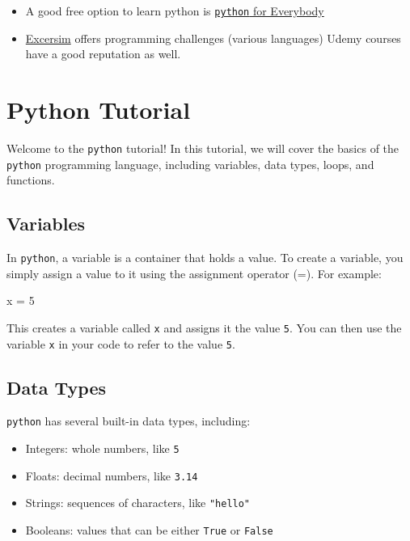 \documentclass[
  letterpaper,
  DIV=11,
  numbers=noendperiod]{scrreprt}
\newenvironment{Shaded}{\begin{snugshade}}{\end{snugshade}}
\newcommand{\DecValTok}[1]{\textcolor[rgb]{0.68,0.00,0.00}{#1}}
\newcommand{\NormalTok}[1]{\textcolor[rgb]{0.00,0.23,0.31}{#1}}
\newcommand{\OperatorTok}[1]{\textcolor[rgb]{0.37,0.37,0.37}{#1}}
\providecommand{\tightlist}{%
  \setlength{\itemsep}{0pt}\setlength{\parskip}{0pt}}\usepackage{longtable,booktabs,array}
\begin{document}
\begin{itemize}
\tightlist
\item
  A good free option to learn python is
  \href{https://www.py4e.com/}{\texttt{python} for Everybody}
\item
  \href{https://exercism.org/}{Excersim} offers programming challenges
  (various languages) Udemy courses have a good reputation as well.
\end{itemize}

\hypertarget{python-tutorial}{%
\chapter{Python Tutorial}\label{python-tutorial}}

Welcome to the \texttt{python} tutorial! In this tutorial, we will cover
the basics of the \texttt{python} programming language, including
variables, data types, loops, and functions.

\hypertarget{variables}{%
\section{Variables}\label{variables}}

In \texttt{python}, a variable is a container that holds a value. To
create a variable, you simply assign a value to it using the assignment
operator (=). For example:

\begin{Shaded}
\begin{Highlighting}[]
\NormalTok{x }\OperatorTok{=} \DecValTok{5}
\end{Highlighting}
\end{Shaded}

This creates a variable called \texttt{x} and assigns it the value
\texttt{5}. You can then use the variable \texttt{x} in your code to
refer to the value \texttt{5}.

\hypertarget{data-types}{%
\section{Data Types}\label{data-types}}

\texttt{python} has several built-in data types, including:

\begin{itemize}
\tightlist
\item
  Integers: whole numbers, like \texttt{5}
\item
  Floats: decimal numbers, like \texttt{3.14}
\item
  Strings: sequences of characters, like \texttt{"hello"}
\item
  Booleans: values that can be either \texttt{True} or \texttt{False}
\end{itemize}
\end{document}
